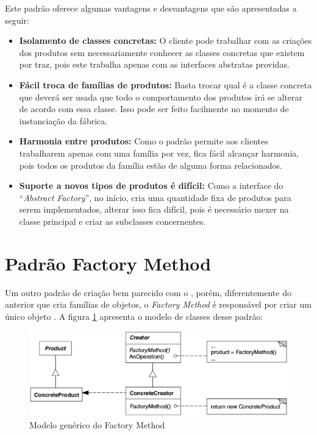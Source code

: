 \begin{apendicesenv}
Este padrão oferece algumas vantagens e desvantagens que são apresentadas a seguir:

\begin{itemize}
	\item \textbf{Isolamento de classes concretas:} O cliente pode trabalhar com as criações dos produtos sem necessariamente conhecer as classes concretas que existem por traz, pois este trabalha apenas com as interfaces abstratas providas.
	\item \textbf{Fácil troca de famílias de produtos:} Basta trocar qual é a classe concreta que deverá ser usada que todo o comportamento dos produtos irá se alterar de acordo com essa classe. Isso pode ser feito facilmente no momento de instanciação da fábrica.
	\item \textbf{Harmonia entre produtos:} Como o padrão permite aos clientes trabalharem apenas com uma família por vez, fica fácil alcançar harmonia, pois todos os produtos da família estão de alguma forma relacionados.
	\item \textbf{Suporte a novos tipos de produtos é difícil:} Como a interface do ``\textit{Abstract Factory}'', no início, cria uma quantidade fixa de produtos para serem implementados, alterar isso fica difícil, pois é necessário mexer na classe principal e criar as subclasses concernentes.
\end{itemize}

\section{Padrão Factory Method}
\label{sec:padrao_factory_method}

Um outro padrão de criação bem parecido com o , porém, diferentemente do anterior que cria famílias de objetos, o \textit{Factory Method} é responsável por criar um único objeto \cite{Gamma:1995}. A figura \ref{factory_method} apresenta o modelo de classes desse padrão:

\newpage
\begin{figure}[!h]
	\centering
	\includegraphics[scale=0.5]{figuras/apendices/factory_method.eps}
	\caption[Modelo genérico do Factory Method]{Modelo genérico do Factory Method \cite{Gamma:1995}}
	\label{factory_method}
\end{figure}


\end{apendicesenv}
